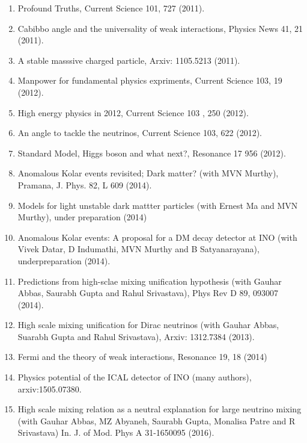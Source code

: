 \begin{enumerate}
\item Profound Truths, Current Science 101, 727 (2011).

\item Cabibbo angle and the universality of weak interactions, Physics News 41, 21 (2011).

\item A stable masssive charged particle, Arxiv: 1105.5213 (2011).

\item Manpower for fundamental physics expriments, Current Science 103, 19 (2012).

\item High energy physics in 2012, Current Science 103 , 250 (2012).

\item An angle to tackle the neutrinos, Current Science 103, 622 (2012).

\item Standard Model, Higgs boson and what next?, Resonance 17 956 (2012).

\item Anomalous Kolar events revisited; Dark matter? (with MVN Murthy), Pramana, J. Phys. 82, L 609 (2014).

\item Models for light unstable dark mattter particles (with Ernest Ma and MVN Murthy), under preparation (2014)

\item Anomalous Kolar events: A proposal for a DM decay detector at INO (with Vivek Datar, D Indumathi, MVN Murthy and B Satyanarayana), underpreparation (2014).

\item Predictions from high-sclae mixing unification hypothesis (with Gauhar Abbas, Saurabh Gupta and Rahul Srivastava), Phys Rev D 89, 093007 (2014).

\item High scale mixing unification for Dirac neutrinos (with Gauhar Abbas, Suarabh Gupta and Rahul Srivastava), Arxiv: 1312.7384 (2013).

\item Fermi and the theory of weak interactions, Resonance 19, 18 (2014)

\item Physics potential of the ICAL detector of INO (many authors), arxiv:1505.07380.

\item High scale mixing relation as a neutral explanation for large neutrino mixing (with Gauhar Abbas, MZ Abyaneh, Saurabh Gupta, Monalisa Patre and R Srivastava) In. J. of Mod. Phys A 31-1650095 (2016).


\end{enumerate}
